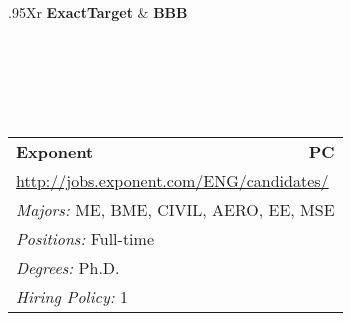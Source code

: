 \documentclass[twoside]{article}
\begin{document}
\begin{center}
\begin{multicols}{3}
\begin{FlushLeft}
\begin{minipage}{\columnwidth}
\end{minipage}
 
\begin{minipage}{\columnwidth}\begin{tabularx}{.95\columnwidth}{Xr}
                 {\Large\bf ExactTarget} & {\Large\bf BBB}\\
    \\
    \\
    \\
    \\
    \\
    \end{tabularx}
    
\end{minipage}
 
\begin{minipage}{\columnwidth}\begin{tabularx}{.95\columnwidth}{Xr}
                 {\Large\bf Exponent} & {\Large\bf PC}\\
    \multicolumn{2}{p{.95\columnwidth}}{\url{http://jobs.exponent.com/ENG/candidates/}}\\
    \multicolumn{2}{p{.95\columnwidth}}{\emph{Majors:} ME, BME, CIVIL, AERO, EE, MSE}\\
    \multicolumn{2}{p{.95\columnwidth}}{\emph{Positions:} Full-time}\\
    \multicolumn{2}{p{.95\columnwidth}}{\emph{Degrees:} Ph.D.}\\
    \multicolumn{2}{p{.95\columnwidth}}{\emph{Hiring Policy:} 1}\\
    \end{tabularx}
    
\end{minipage}
 

\end{FlushLeft}
\end{multicols}
\end{center}
\end{document}
